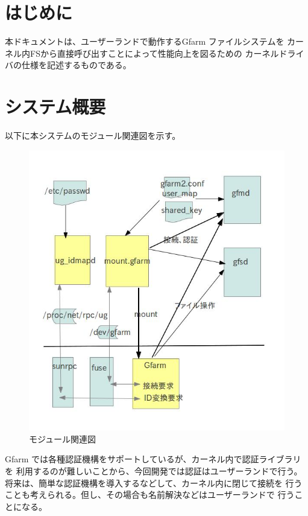 \section*{はじめに}
本ドキュメントは、ユーザーランドで動作するGfarm ファイルシステムを
カーネル内FSから直接呼び出すことによって性能向上を図るための
カーネルドライバの仕様を記述するものである。

\section{システム概要}

以下に本システムのモジュール関連図を示す。

\begin{figure}[htb]\begin{center}
\includegraphics[bb=00 00 800 850,scale=0.5]{module.jpg}
\caption{モジュール関連図}\label{fig:module}
\end{center}\end{figure}

Gfarm では各種認証機構をサポートしているが、カーネル内で認証ライブラリを
利用するのが難しいことから、今回開発では認証はユーザーランドで行う。
将来は、簡単な認証機構を導入するなどして、カーネル内に閉じて接続を
行うことも考えられる。但し、その場合も名前解決などはユーザーランドで
行うことになる。

